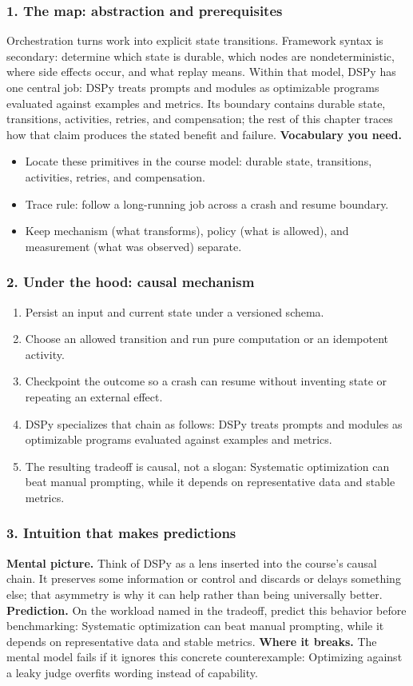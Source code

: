 \subsubsection*{1. The map: abstraction and prerequisites}
Orchestration turns work into explicit state transitions. Framework syntax is secondary: determine which state is durable, which nodes are nondeterministic, where side effects occur, and what replay means.
Within that model, DSPy has one central job: DSPy treats prompts and modules as optimizable programs evaluated against examples and metrics. Its boundary contains durable state, transitions, activities, retries, and compensation; the rest of this chapter traces how that claim produces the stated benefit and failure.
\textbf{Vocabulary you need.}\begin{itemize}
\item Locate these primitives in the course model: durable state, transitions, activities, retries, and compensation.
\item Trace rule: follow a long-running job across a crash and resume boundary.
\item Keep mechanism (what transforms), policy (what is allowed), and measurement (what was observed) separate.
\end{itemize}
\subsubsection*{2. Under the hood: causal mechanism}\begin{enumerate}
\item Persist an input and current state under a versioned schema.
\item Choose an allowed transition and run pure computation or an idempotent activity.
\item Checkpoint the outcome so a crash can resume without inventing state or repeating an external effect.
\item DSPy specializes that chain as follows: DSPy treats prompts and modules as optimizable programs evaluated against examples and metrics.
\item The resulting tradeoff is causal, not a slogan: Systematic optimization can beat manual prompting, while it depends on representative data and stable metrics.
\end{enumerate}
\subsubsection*{3. Intuition that makes predictions}
\textbf{Mental picture.} Think of DSPy as a lens inserted into the course's causal chain. It preserves some information or control and discards or delays something else; that asymmetry is why it can help rather than being universally better.
\textbf{Prediction.} On the workload named in the tradeoff, predict this behavior before benchmarking: Systematic optimization can beat manual prompting, while it depends on representative data and stable metrics.
\textbf{Where it breaks.} The mental model fails if it ignores this concrete counterexample: Optimizing against a leaky judge overfits wording instead of capability.
